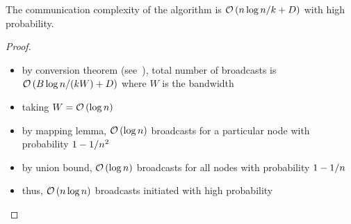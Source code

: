 \begin{frame}
    \begin{lemma}
        The communication complexity of the algorithm is $\mathcal{O}\left(n\log n/k + D\right)$
        with high probability.
    \end{lemma}
    \begin{proof}
        \begin{itemize}
            \item by conversion theorem (see~), total number of broadcasts is $\mathcal{O}\left(B\log{n} / (kW) + D\right)$ where $W$ is the bandwidth
            \item taking $W = \mathcal{O}\left(\log{n}\right)$
            \item by mapping lemma, $\mathcal{O}\left(\log{n}\right)$ broadcasts for a particular
            node with probability $1 - 1 / n^2$
            \item by union bound, $\mathcal{O}\left(\log{n}\right)$ broadcasts for all nodes with 
            probability $1 - 1 / n$
            \item thus, $\mathcal{O}\left(n\log{n}\right)$ broadcasts initiated with high probability
        \end{itemize}
    \end{proof}
\end{frame}